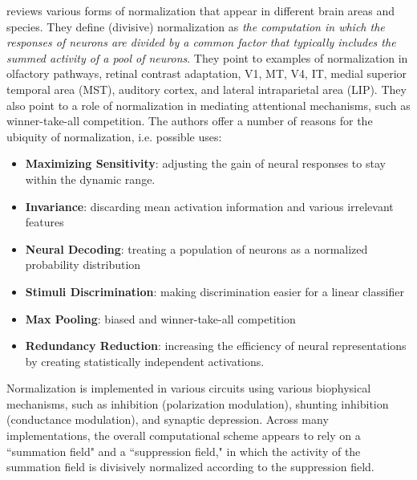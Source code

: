 \cite{carandini2012normalization} reviews various forms of normalization that appear in different brain areas and species. They define (divisive) normalization as \textit{the computation in which the responses of neurons are divided by a common factor that typically includes the summed activity of a pool of neurons}. They point to examples of normalization in olfactory pathways, retinal contrast adaptation, V1, MT, V4, IT, medial superior temporal area (MST), auditory cortex, and lateral intraparietal area (LIP). They also point to a role of normalization in mediating attentional mechanisms, such as winner-take-all competition. The authors offer a number of reasons for the ubiquity of normalization, i.e. possible uses:
\begin{itemize}
	\item \textbf{Maximizing Sensitivity}: adjusting the gain of neural responses to stay within the dynamic range.
	\item \textbf{Invariance}: discarding mean activation information and various irrelevant features
	\item \textbf{Neural Decoding}: treating a population of neurons as a normalized probability distribution
	\item \textbf{Stimuli Discrimination}: making discrimination easier for a linear classifier
	\item \textbf{Max Pooling}: biased and winner-take-all competition
	\item \textbf{Redundancy Reduction}: increasing the efficiency of neural representations by creating statistically independent activations.
\end{itemize}
Normalization is implemented in various circuits using various biophysical mechanisms, such as inhibition (polarization modulation), shunting inhibition (conductance modulation), and synaptic depression. Across many implementations, the overall computational scheme appears to rely on a ``summation field" and a ``suppression field," in which the activity of the summation field is divisively normalized according to the suppression field.